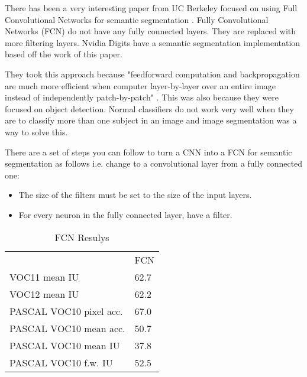 There has been a very interesting paper from UC Berkeley focused on using Full Convolutional
Networks for semantic segmentation \parencite{fcn}. Fully Convolutional Networks
(FCN)
do not have any fully connected layers. They are replaced with more filtering
layers. Nvidia Digits have a semantic segmentation implementation based off the
work of this paper.

They took this approach because "feedforward computation and backpropagation are
much more efficient when computer layer-by-layer over an entire image instead of
independently patch-by-patch" \parencite{fcn}. This was also because they
were focused on object detection. Normal classifiers do not work very well when
they are to classify more than one subject in an image and image segmentation
was a way to solve this.

There are a set of steps you can follow to turn a CNN into a FCN for semantic
segmentation as follows i.e. change to a convolutional layer from a fully
connected one:
\begin{itemize}
    \item{The size of the filters must be set to the size of the input layers.}
    \item{For every neuron in the fully connected layer, have a filter.}
\end{itemize}

\begin{table}[]
\centering
\caption{FCN Resulys \parencite{fcn}}
\label{fcn}
\begin{tabular}{ll}
                        & FCN  \\
VOC11 mean IU           & 62.7 \\
VOC12 mean IU           & 62.2 \\
PASCAL VOC10 pixel acc. & 67.0 \\
PASCAL VOC10 mean acc.  & 50.7 \\
PASCAL VOC10 mean IU    & 37.8 \\
PASCAL VOC10 f.w. IU    & 52.5
\end{tabular}
\end{table}
